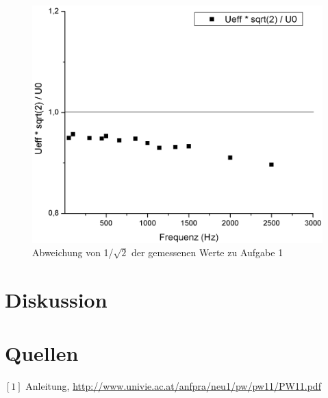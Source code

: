 \documentclass[12pt,a4paper]{article}
\begin{document}
\begin{multicols}{2}
\begin{figure}[H]
	\centering
	\includegraphics[scale=0.25]{./figure/Abweichung_Aufgabe1.png}
	\caption{Abweichung von 1/$\sqrt{2}$ der gemessenen Werte zu Aufgabe 1}
	\label{fig:abw_aufgabe1}
\end{figure}

\section{Diskussion}



\section{Quellen}
$[1]$ Anleitung, \url{http://www.univie.ac.at/anfpra/neu1/pw/pw11/PW11.pdf}\\
\end{multicols}
\end{document}

